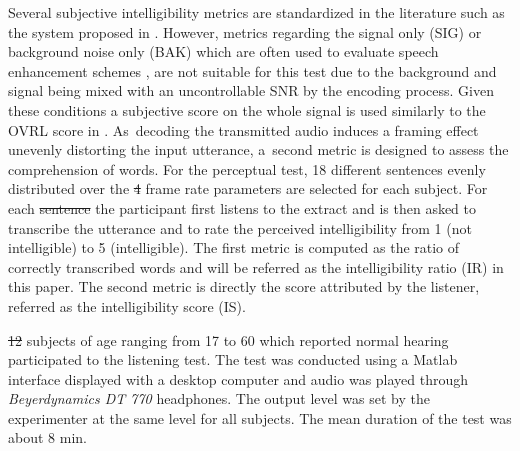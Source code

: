 \documentclass[sensors,article,accept,moreauthors,pdftex,10pt,a4paper]{mdpi}
\providecommand{\DIFaddtex}[1]{{\protect\color{blue}\uwave{#1}}} %
\providecommand{\DIFdeltex}[1]{{\protect\color{red}\sout{#1}}}                      %
\providecommand{\DIFaddbegin}{} %
\providecommand{\DIFaddend}{} %
\providecommand{\DIFdelbegin}{} %
\providecommand{\DIFdelend}{} %
\providecommand{\DIFadd}[1]{\texorpdfstring{\DIFaddtex{#1}}{#1}} %
\providecommand{\DIFdel}[1]{\texorpdfstring{\DIFdeltex{#1}}{}} %
\begin{document}
Several subjective intelligibility metrics are standardized in the literature such as the system proposed in \cite{itup835}. However, metrics regarding the signal only (SIG) or background noise only (BAK) which are often used to evaluate speech enhancement schemes \citep{ntalampiras2008}, are not suitable for this test due to the background and signal being mixed with an uncontrollable SNR by the encoding process. Given these conditions a subjective score on the whole signal is used similarly to the OVRL score in \cite{itup835}. As~decoding the transmitted audio induces a framing effect unevenly distorting the input utterance, a~second metric is designed to assess the comprehension of words. For the perceptual test, 18 different sentences evenly distributed over the \DIFdelbegin \DIFdel{4 }\DIFdelend \DIFaddbegin {\DIFadd{four}} \DIFaddend frame rate parameters are selected for each subject. For each \DIFdelbegin \DIFdel{sentence }\DIFdelend \DIFaddbegin {\DIFadd{sentence,}} \DIFaddend the participant first listens to the extract and is then asked to transcribe the utterance and to rate the perceived intelligibility from 1 (not intelligible) to 5 (intelligible). The first metric is computed as the ratio of correctly transcribed words and will be referred as the intelligibility ratio (IR) in this paper. The second metric is directly the score attributed by the listener, referred as the intelligibility score (IS).

\DIFdelbegin \DIFdel{12 }\DIFdelend \DIFaddbegin {\DIFadd{Twelve}} \DIFaddend subjects of age ranging from 17 to 60 which reported normal hearing participated to the listening test. The test was conducted using a Matlab interface displayed with a desktop computer and audio was played through \textit{Beyerdynamics DT 770} headphones. The output level was set by the experimenter at the same level for all subjects. The mean duration of the test was about 8 min.
\end{document}
